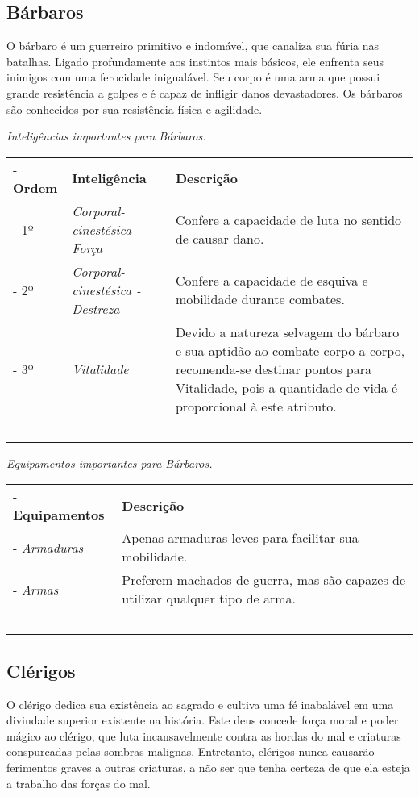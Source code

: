 \subsection*{Bárbaros}
O bárbaro é um guerreiro primitivo e indomável, que canaliza sua fúria nas batalhas. Ligado profundamente aos instintos mais básicos, ele enfrenta seus inimigos com uma ferocidade inigualável. Seu corpo é uma arma que possui grande resistência a golpes e é capaz de infligir danos devastadores. Os bárbaros são conhecidos por sua resistência física e agilidade.

\begin{table}[htb]
	\centering\smaller
	\emph{Inteligências importantes para Bárbaros.} \\
	\begin{tabu} to \textwidth {|X[c 0.5]|X[1]|X[3]|} \tabucline-
		\textbf{Ordem}	& \textbf{Inteligência}	&	\textbf{Descrição}	\\ \tabucline-
		1º		& \emph{Corporal-cinestésica - Força}  	& Confere a capacidade de luta no sentido de causar dano.	\\ \tabucline-
		2º		& \emph{Corporal-cinestésica - Destreza} & Confere a capacidade de esquiva e mobilidade durante combates. \\ \tabucline-
		3º		& \emph{Vitalidade} & Devido a natureza selvagem do bárbaro e sua aptidão ao combate corpo-a-corpo, recomenda-se destinar pontos para Vitalidade, pois a quantidade de vida é proporcional à este atributo.\\ \tabucline-
	\end{tabu}
\end{table}

\begin{table}[htb]
	\centering\smaller
	\emph{Equipamentos importantes para Bárbaros.}
	\begin{tabu} to \textwidth {|X[0.5]|X[3]|} \tabucline-
		\textbf{Equipamentos}	&	\textbf{Descrição}	\\ \tabucline-
		\emph{Armaduras}  	& Apenas armaduras leves para facilitar sua mobilidade.	\\ \tabucline-
		\emph{Armas} & Preferem machados de guerra, mas são capazes de utilizar qualquer tipo de arma.\\ \tabucline-
	\end{tabu}
\end{table}

\subsection*{Clérigos}
O clérigo dedica sua existência ao sagrado e cultiva uma fé inabalável em uma divindade superior existente na história. Este deus concede força moral e poder mágico ao clérigo, que luta incansavelmente contra as hordas do mal e criaturas conspurcadas pelas sombras malignas. Entretanto, clérigos nunca causarão ferimentos graves a outras criaturas, a não ser que tenha certeza de que ela esteja a trabalho das forças do mal.

